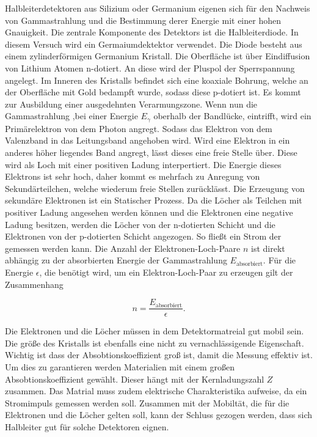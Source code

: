 Halbleiterdetektoren aus Silizium oder Germanium eigenen sich für den Nachweis von Gammastrahlung und die Bestimmung derer Energie mit einer hohen Gnauigkeit.
Die zentrale Komponente des Detektors ist die Halbleiterdiode. In diesem Versuch wird ein Germaiumdektektor verwendet.
Die Diode besteht aus einem zylinderförmigen Germanium Kristall. Die Oberfläche ist über Eindiffusion von Lithium Atomen n-dotiert.
An diese wird der Pluspol der Sperrspannung angelegt. Im Inneren des Kristalls befindet sich eine koaxiale Bohrung, welche an der Oberfläche mit Gold bedampft wurde, sodass diese p-dotiert ist.
Es kommt zur Ausbildung einer ausgedehnten Verarmungszone. Wenn nun die Gammastrahlung ,bei einer Energie $E_{\gamma} $ oberhalb der Bandlücke, eintrifft, wird ein Primärelektron von dem Photon angregt.
Sodass das Elektron von dem Valenzband in das Leitungsband angehoben wird. Wird eine Elektron in ein anderes höher liegendes Band angregt, lässt dieses eine freie Stelle über. 
Diese wird als Loch mit einer positiven Ladung interpertiert.
Die Energie dieses Elektrons ist sehr hoch, daher kommt es mehrfach zu Anregung von Sekundärteilchen, welche wiederum freie Stellen zurücklässt. Die Erzeugung von sekundäre Elektronen ist ein Statischer Prozess.
Da die Löcher als Teilchen mit positiver Ladung angesehen werden können und die Elektronen eine negative Ladung besitzen, werden die Löcher von der n-dotierten Schicht und die Elektronen von der p-dotierten Schicht angezogen.
So fließt ein Strom der gemessen werden kann.
Die Anzahl der Elektronen-Loch-Paare $n$ ist direkt abhängig zu der absorbierten Energie der Gammastrahlung $E_{\text{absorbiert}}$. Für die Energie $\epsilon$, die benötigt wird,
um ein Elektron-Loch-Paar zu erzeugen gilt der Zusammenhang

\begin{equation}
    n = \frac{E_{\text{absorbiert}}}{\epsilon}.
\end{equation}

Die Elektronen und die Löcher müssen in dem Detektormatreial gut mobil sein. Die größe des Kristalls ist ebenfalls eine nicht zu vernachlässigende Eigenschaft.
Wichtig ist dass der Absobtionskoeffizient groß ist, damit die Messung effektiv ist. Um dies zu garantieren werden Materialien mit einem großen Absobtionskoeffizient
gewählt. Dieser hängt mit der Kernladungszahl $Z$ zusammen. Das Matrial muss zudem elektrische Charakteristika aufweise, da ein Stromimpuls gemessen werden soll. Zusammen mit der Mobiltät, die für die
Elektronen und die Löcher gelten soll, kann der Schluss gezogen werden, dass sich Halbleiter gut für solche Detektoren eignen.

